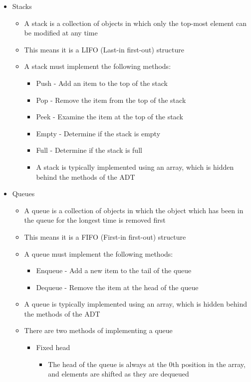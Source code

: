 \begin{itemize}
  \item Stacks
  \begin{itemize}
    \item A stack is a collection of objects in which only the top-most element can be modified at any time
    \item This means it is a LIFO (Last-in first-out) structure
    \item A stack must implement the following methods:
    \begin{itemize}
      \item Push - Add an item to the top of the stack
      \item Pop - Remove the item from the top of the stack
      \item Peek - Examine the item at the top of the stack
      \item Empty - Determine if the stack is empty
      \item Full - Determine if the stack is full
      \item A stack is typically implemented using an array, which is hidden behind the methods of the ADT
    \end{itemize}
  \end{itemize}
  \item Queues
  \begin{itemize}
    \item A queue is a collection of objects in which the object which has been in the queue for the longest time is removed first
    \item This means it is a FIFO (First-in first-out) structure
    \item A queue must implement the following methods:
    \begin{itemize}
      \item Enqueue - Add a new item to the tail of the queue
      \item Dequeue - Remove the item at the head of the queue
    \end{itemize}
    \item A queue is typically implemented using an array, which is hidden behind the methods of the ADT
    \item There are two methods of implementing a queue
    \begin{itemize}
      \item Fixed head
      \begin{itemize}
        \item The head of the queue is always at the 0th position in the array, and elements are shifted as they are dequeued

\end{itemize}
\end{itemize}
\end{itemize}
\end{itemize}
